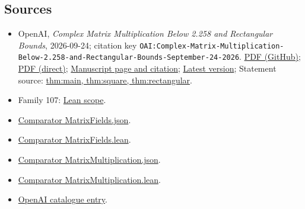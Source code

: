 \documentclass[11pt]{article}
\begin{document}
\subsection{Sources}
\begin{itemize}
\item OpenAI, \emph{Complex Matrix Multiplication Below 2.258 and Rectangular Bounds}, 2026-09-24; citation key \texttt{OAI:Complex-Matrix-Multiplication-Below-2.258-and-Rectangular-Bounds-September-24-2026}. \href{https://github.com/openai/math/blob/adc7f1241b42e322a6451854ab7e4b4c146bf78a/preprints/Complex-Matrix-Multiplication-Below-2.258-and-Rectangular-Bounds-September-24-2026/Complex-Matrix-Multiplication-Below-2.258-and-Rectangular-Bounds-September-24-2026.pdf}{PDF (GitHub)}; \href{https://github.com/openai/math/raw/adc7f1241b42e322a6451854ab7e4b4c146bf78a/preprints/Complex-Matrix-Multiplication-Below-2.258-and-Rectangular-Bounds-September-24-2026/Complex-Matrix-Multiplication-Below-2.258-and-Rectangular-Bounds-September-24-2026.pdf}{PDF (direct)}; \href{https://github.com/openai/math/blob/adc7f1241b42e322a6451854ab7e4b4c146bf78a/preprints/Complex-Matrix-Multiplication-Below-2.258-and-Rectangular-Bounds-September-24-2026/README.md}{Manuscript page and citation}; \href{https://github.com/openai/math/blob/main/preprints/Complex-Matrix-Multiplication-Below-2.258-and-Rectangular-Bounds-September-24-2026/Complex-Matrix-Multiplication-Below-2.258-and-Rectangular-Bounds-September-24-2026.pdf}{Latest version}; Statement source: \href{https://github.com/openai/math/blob/adc7f1241b42e322a6451854ab7e4b4c146bf78a/preprints/Complex-Matrix-Multiplication-Below-2.258-and-Rectangular-Bounds-September-24-2026/build/introduction.tex\#L72}{thm:main, thm:square, thm:rectangular}.
\item Family 107: \href{https://github.com/openai/math/blob/adc7f1241b42e322a6451854ab7e4b4c146bf78a/lean/docs/107.md}{Lean scope}.
\item \href{https://github.com/openai/math/blob/adc7f1241b42e322a6451854ab7e4b4c146bf78a/lean/ComparatorChallenges/MatrixFields.json}{Comparator MatrixFields.json}.
\item \href{https://github.com/openai/math/blob/adc7f1241b42e322a6451854ab7e4b4c146bf78a/lean/ComparatorChallenges/MatrixFields.lean}{Comparator MatrixFields.lean}.
\item \href{https://github.com/openai/math/blob/adc7f1241b42e322a6451854ab7e4b4c146bf78a/lean/ComparatorChallenges/MatrixMultiplication.json}{Comparator MatrixMultiplication.json}.
\item \href{https://github.com/openai/math/blob/adc7f1241b42e322a6451854ab7e4b4c146bf78a/lean/ComparatorChallenges/MatrixMultiplication.lean}{Comparator MatrixMultiplication.lean}.
\item \href{https://github.com/openai/math/blob/adc7f1241b42e322a6451854ab7e4b4c146bf78a/CONTENTS.md}{OpenAI catalogue entry}.
\end{itemize}
\end{document}
